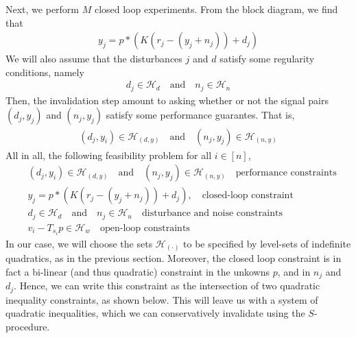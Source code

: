 \documentclass[11pt]{article} %
\theoremstyle{plain}
\theoremstyle{definition}
\theoremstyle{remark}
\begin{document}
Next, we perform $M$ closed loop experiments. From the block diagram, we find that
\begin{eqnarray}
y_j = p * (K (r_j - (y_j + n_j)) + d_j)
\end{eqnarray}
We will also assume that the disturbances $j$ and $d$ satisfy some regularity conditions, namely 
\begin{eqnarray}
d_j \in \mathcal{H}_{d} \quad \text{and} \quad n_j \in \mathcal{H}_n
\end{eqnarray}
Then, the invalidation step amount to asking whether or not the signal pairs $(d_j,y_j)$ and $(n_j,y_j)$ satisfy some performance guarantes. That is, 
\begin{eqnarray}
(d_j,y_i) \in \mathcal{H}_{(d,y)} \quad \text{and} \quad (n_j,y_j) \in \mathcal{H}_{(n,y)}
\end{eqnarray}
All in all, the following feasibility problem for all $i \in [n]$, 
\begin{align*}
  & (d_j,y_i) \in \mathcal{H}_{(d,y)} \quad \text{and} \quad (n_j,y_j) \in \mathcal{H}_{(n,y)} \quad \text{performance constraints}
  \\
  & y_j = p * ( K(r_j-(y_j+n_j)) +d_j), \quad\text{closed-loop constraint}
  \\
  & d_j \in \mathcal{H}_{d} \quad \text{and} \quad n_j \in \mathcal{H}_n \quad \text{disturbance and noise constraints}
  \\
  & v_i - T_{s_i}p \in \mathcal{H}_{w} \quad \text{open-loop constraints}
\end{align*}
In our case, we  will choose the sets $\mathcal{H}_{(\cdot)}$ to be specified by level-sets of indefinite quadratics, as in the previous section. Moreover, the closed loop constraint is in fact a bi-linear (and thus quadratic) constraint in the unkowns $p$, and in $n_j$ and $d_j$. Hence, we can write this constraint as the intersection of two quadratic inequality constraints, as shown below. This will leave us with a system of quadratic inequalities, which we can conservatively invalidate using the $S$-procedure.
\end{document}
